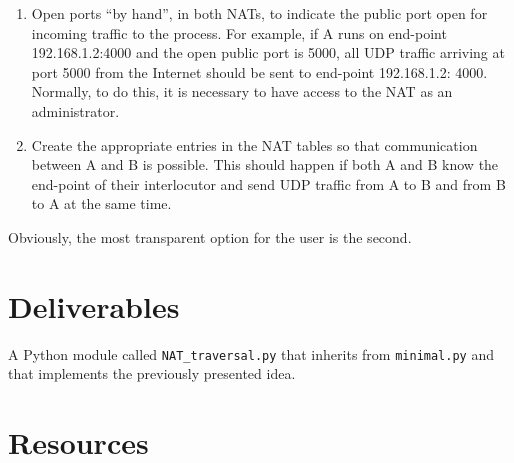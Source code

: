 \begin{enumerate}
\item Open ports ``by hand'', in both NATs, to indicate the public
  port open for incoming traffic to the process. For example, if A
  runs on end-point 192.168.1.2:4000 and the open public port is 5000,
  all UDP traffic arriving at port 5000 from the Internet should be
  sent to end-point 192.168.1.2: 4000. Normally, to do this, it is
  necessary to have access to the NAT as an administrator.

\item Create the appropriate entries in the NAT tables so that
  communication between A and B is possible. This should happen if
  both A and B know the end-point of their interlocutor and send UDP
  traffic from A to B and from B to A at the same time.
\end{enumerate}
  
Obviously, the most transparent option for the user is the second.

\section{Deliverables}

A Python module called \texttt{NAT\_traversal.py} that inherits from
\texttt{minimal.py} and that implements the previously presented idea.

\section{Resources}


